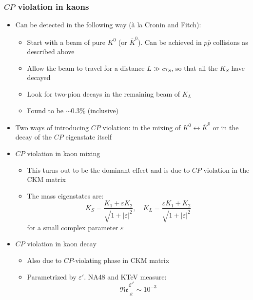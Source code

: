 \documentclass[11pt]{article}
\newcommand{\CP}{\ensuremath{CP}\xspace}
\begin{document}
  \subsubsection{\CP violation in kaons}
  \begin{itemize}
    \item Can be detected in the following way (\`a la Cronin and Fitch):
    \begin{itemize}
      \item Start with a beam of pure $K^0$ (or $\bar K^0$). Can be achieved in $p\bar p$ collisions as described above
      \item Allow the beam to travel for a distance $L\gg c\tau_S$, so that all the $K_S$ have decayed
      \item Look for two-pion decays in the remaining beam of $K_L$
      \item Found to be $\sim 0.3\%$ (inclusive)
    \end{itemize}
    \item Two ways of introducing \CP violation: in the mixing of $K^0\leftrightarrow \bar K^0$ or in the decay of the \CP eigenstate itself
    \item \CP violation in kaon mixing
    \begin{itemize}
      \item This turns out to be the dominant effect and is due to \CP violation in the CKM matrix
      \item The mass eigenstates are:
      \begin{equation}
        K_S = \frac{K_1 + \varepsilon K_2}{\sqrt{1+|\varepsilon|^2}},\quad K_L = \frac{\varepsilon K_1 +  K_2}{\sqrt{1+|\varepsilon|^2}}
      \end{equation}
      for a small complex parameter $\varepsilon$
    \end{itemize}
    \item \CP violation in kaon decay
    \begin{itemize}
      \item Also due to \CP-violating phase in CKM matrix
      \item Parametrized by $\varepsilon'$. NA48 and KTeV measure:
      \begin{equation}
        \mathfrak{Re} \frac{\varepsilon'}{\varepsilon} \sim 10^{-3}
      \end{equation}
    \end{itemize}
  \end{itemize}
\end{document}
